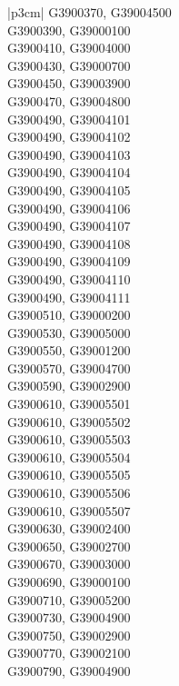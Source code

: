 \begin{customLongTable}{ |p{3cm}| }
G3900370, G39004500 \\ \hline
G3900390, G39000100 \\ \hline
G3900410, G39004000 \\ \hline
G3900430, G39000700 \\ \hline
G3900450, G39003900 \\ \hline
G3900470, G39004800 \\ \hline
G3900490, G39004101 \\ \hline
G3900490, G39004102 \\ \hline
G3900490, G39004103 \\ \hline
G3900490, G39004104 \\ \hline
G3900490, G39004105 \\ \hline
G3900490, G39004106 \\ \hline
G3900490, G39004107 \\ \hline
G3900490, G39004108 \\ \hline
G3900490, G39004109 \\ \hline
G3900490, G39004110 \\ \hline
G3900490, G39004111 \\ \hline
G3900510, G39000200 \\ \hline
G3900530, G39005000 \\ \hline
G3900550, G39001200 \\ \hline
G3900570, G39004700 \\ \hline
G3900590, G39002900 \\ \hline
G3900610, G39005501 \\ \hline
G3900610, G39005502 \\ \hline
G3900610, G39005503 \\ \hline
G3900610, G39005504 \\ \hline
G3900610, G39005505 \\ \hline
G3900610, G39005506 \\ \hline
G3900610, G39005507 \\ \hline
G3900630, G39002400 \\ \hline
G3900650, G39002700 \\ \hline
G3900670, G39003000 \\ \hline
G3900690, G39000100 \\ \hline
G3900710, G39005200 \\ \hline
G3900730, G39004900 \\ \hline
G3900750, G39002900 \\ \hline
G3900770, G39002100 \\ \hline
G3900790, G39004900 \\ \hline

\end{customLongTable}

